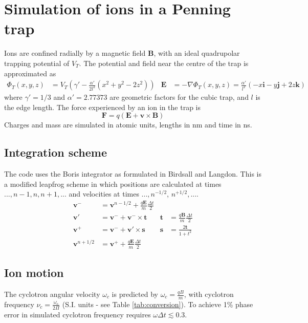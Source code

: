 \documentclass[10pt,conference,onecolumn]{IEEEtran}
\begin{document}
\section{Simulation of ions in a Penning trap}

Ions are confined radially by a magnetic field $\mathbf{B}$, with an ideal quadrupolar trapping potential of $V_T$.
The potential and field near the centre of the trap is approximated as 
\begin{align}
\Phi_T(x,y,z) &= V_T (\gamma' - \frac{\alpha'}{2l^2}(x^2 + y^2 - 2z^2)) &
\mathbf{E} &= - \nabla \Phi_T(x,y,z) = \frac{\alpha'}{l^2}(-x\mathbf{i} -y\mathbf{j} +2z\mathbf{k})
\end{align}
where $\gamma' = 1/3$ and $\alpha' = 2.77373$ are geometric factors for the cubic trap, and $l$ is the edge length\cite{Guan1995}.
The force experienced by an ion in the trap is
\begin{equation}
\mathbf{F} = q(\mathbf{E} + \mathbf{v} \times \mathbf{B})
\end{equation}
Charges and mass are simulated in atomic units, lengths in nm and time in ns.



\subsection{Integration scheme}
The code uses the Boris integrator\cite{Boris1970} as formulated in Birdsall and Langdon\cite{Birdsall1985}.
This is a modified leapfrog scheme in which positions are calculated at times $..., n-1, n, n+1, ...$ and velocities at times $..., n^{-1/2}$, $n^{+1/2}, ...$.
\begin{align}
\mathbf{v}^- &= \mathbf{v}^{n-1/2} + \frac{q \mathbf{E}}{m} \frac{\Delta t}{2} \\
\mathbf{v}'  &= \mathbf{v}^- + \mathbf{v}^- \times \mathbf{t} & \mathbf{t}   &= \frac{q\mathbf{B}}{m} \frac{\Delta t}{2} \\
\mathbf{v}^+ &= \mathbf{v}^- + \mathbf{v}' \times \mathbf{s} & \mathbf{s}   &= \frac{2\mathbf{t}}{1 + t^2} \\
\mathbf{v}^{n+1/2} &= \mathbf{v}^+ + \frac{q \mathbf{E}}{m} \frac{\Delta t}{2}
\end{align}


\subsection{Ion motion}

The cyclotron angular velocity $\omega_c$ is predicted by $\omega_c = \frac{q B}{m}$, with cyclotron frequency $\nu_c = \frac{\omega_c}{2 \Pi}$\cite{Guan1995} (S.I. units - see Table \ref{tab:conversion}).  
To achieve 1\% phase error in simulated cyclotron frequency requires $\omega \Delta t \lesssim 0.3$\cite{Birdsall1985,Patacchini2009}.
\end{document}
